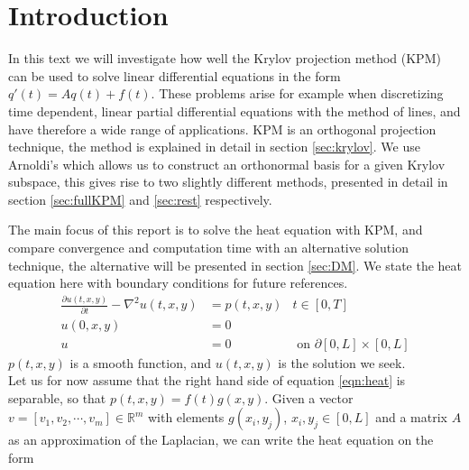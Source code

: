 \chapter{Introduction}%

In this text we will investigate how well the Krylov projection method (KPM) can be used to solve linear differential equations in the form $q'(t)=Aq(t)+f(t)$. These problems arise for example when discretizing time dependent, linear partial differential equations with the method of lines, and have therefore a wide range of applications. 
KPM is an orthogonal projection technique, the method is explained in detail in section \ref{sec:krylov}. We use Arnoldi's which allows us to construct an orthonormal basis for a given Krylov subspace, this gives rise to two slightly different methods, presented in detail in section \ref{sec:fullKPM} and \ref{sec:rest} respectively.

The main focus of this report is to solve the heat equation with KPM, and compare convergence and computation time with an alternative solution technique, the alternative will be presented in section \ref{sec:DM}.
We state the heat equation here with boundary conditions for future references. \\
\begin{equation} \label{eqn:heat}
\begin{aligned}
\frac{\partial u(t,x,y)}{\partial t} - \nabla^2 u(t,x,y) &= p(t,x,y) & t \in [0,T]\\
u(0,x,y) &= 0 \\
u & = 0 			&\text{ on } \partial [0,L] \times [0,L]
\end{aligned}
\end{equation}
$p(t,x,y)$ is a smooth function, and $u(t,x,y)$ is the solution we seek.\\

Let us for now assume that the right hand side of equation \eqref{eqn:heat} is separable, so that $p(t,x,y) = f(t)g(x,y) $. 
Given a vector $v = [v_1,v_2, \cdots, v_m] \in \mathbb{R}^m $ with elements $ g(x_i,y_j)$, $x_i,y_j \in [0,L]$ and a matrix $A$ as an approximation of the Laplacian, we can write the heat equation on the form


